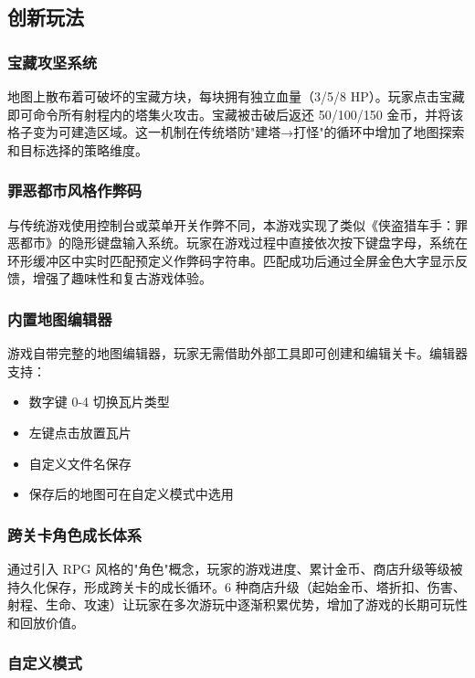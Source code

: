 \documentclass[12pt,a4paper]{ctexart}
\begin{document}
\subsection{创新玩法}

\subsubsection{宝藏攻坚系统}

地图上散布着可破坏的宝藏方块，每块拥有独立血量（3/5/8 HP）。玩家点击宝藏即可命令所有射程内的塔集火攻击。宝藏被击破后返还 50/100/150 金币，并将该格子变为可建造区域。这一机制在传统塔防"建塔→打怪"的循环中增加了地图探索和目标选择的策略维度。

\subsubsection{罪恶都市风格作弊码}

与传统游戏使用控制台或菜单开关作弊不同，本游戏实现了类似《侠盗猎车手：罪恶都市》的隐形键盘输入系统。玩家在游戏过程中直接依次按下键盘字母，系统在环形缓冲区中实时匹配预定义作弊码字符串。匹配成功后通过全屏金色大字显示反馈，增强了趣味性和复古游戏体验。

\subsubsection{内置地图编辑器}

游戏自带完整的地图编辑器，玩家无需借助外部工具即可创建和编辑关卡。编辑器支持：
\begin{itemize}
    \item 数字键 0-4 切换瓦片类型
    \item 左键点击放置瓦片
    \item 自定义文件名保存
    \item 保存后的地图可在自定义模式中选用
\end{itemize}

\subsubsection{跨关卡角色成长体系}

通过引入 RPG 风格的"角色"概念，玩家的游戏进度、累计金币、商店升级等级被持久化保存，形成跨关卡的成长循环。6 种商店升级（起始金币、塔折扣、伤害、射程、生命、攻速）让玩家在多次游玩中逐渐积累优势，增加了游戏的长期可玩性和回放价值。

\subsubsection{自定义模式}
\end{document}
